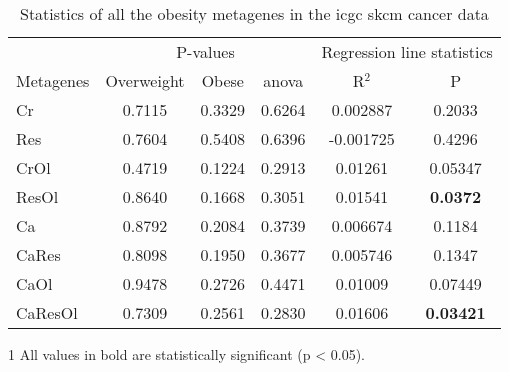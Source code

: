\begin{appendices}
\begin{table}[htpb]
	\centering
	\caption[Statistics of all the obesity metagenes in the \gls{icgc} \acrshort{skcm} cancer data]{Statistics of all the obesity metagenes in the \gls{icgc} \gls{skcm} cancer data}
	\label{tab:degmetaskcm}
	\begin{threeparttable}
		\begin{tabular}{lccccc}
			& \multicolumn{3}{c}{ P-values} & \multicolumn{2}{c}{ Regression line statistics}\\
			\cmidrule(r){2-4} \cmidrule(r){5-6}
			Metagenes &  Overweight &  Obese &  \gls{anova} &  R$^2$ &  P \\
			\hline
			\hline
			\rule{0pt}{2.25ex}Cr      & 0.7115                      & 0.3329  & 0.6264             & 0.002887   & 0.2033              \\
			Res     & 0.7604                      & 0.5408  & 0.6396             & -0.001725  & 0.4296              \\
			CrOl    & 0.4719                      & 0.1224  & 0.2913             & 0.01261    & 0.05347             \\
			ResOl   & 0.8640                      & 0.1668  & 0.3051             & 0.01541    & {\bfseries 0.0372}\tnote{1}  \\
			Ca      & 0.8792                      & 0.2084  & 0.3739             & 0.006674   & 0.1184              \\
			CaRes   & 0.8098                      & 0.1950  & 0.3677             & 0.005746   & 0.1347              \\
			CaOl    & 0.9478                      & 0.2726  & 0.4471             & 0.01009    & 0.07449             \\
			CaResOl & 0.7309                      & 0.2561  & 0.2830             & 0.01606    & {\bfseries 0.03421} \\
			\hline
			\hline
		\end{tabular}
		\begin{tablenotes}
			\begin{footnotesize}
				\item [1] All values in bold are statistically significant (p \textless{} 0.05).
			\end{footnotesize}
		\end{tablenotes}
	\end{threeparttable}
\end{table}


\end{appendices}
